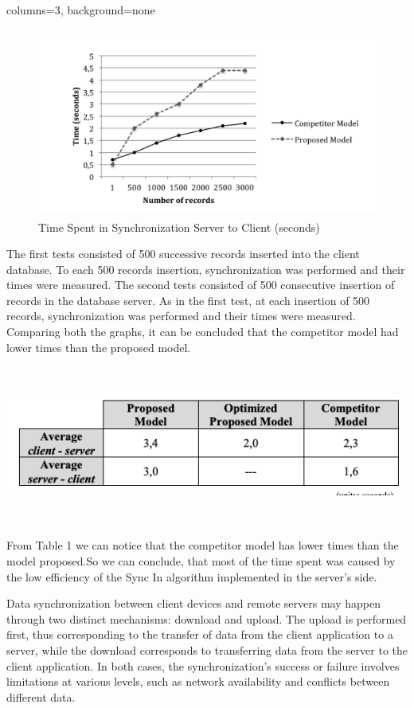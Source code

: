 \documentclass[portrait, paperwidth=91cm, paperheight=121cm, fontscale=0.35]{baposter}
\begin{document}
\begin{poster}{columns=3, background=none}
{     \begin{figure}[H]
     \centering
     \includegraphics[height=6.2cm, width=\textwidth]{graph2.png}
      \caption{Time Spent in Synchronization Server to Client (seconds)}\label{graph2}
     \end{figure}
     
The first tests consisted of 500 successive records inserted into the client database. To each 500 records insertion, synchronization was performed and their times were measured. The second tests consisted of 500 consecutive insertion of records in the database server. As in the first test, at each insertion of 500 records, synchronization was performed and their times were measured. Comparing both the graphs, it can be concluded that the competitor model had lower times than the proposed model.

      
      \centering
      \includegraphics[height=5.2cm, width=\textwidth]{table1.png}
      \caption{Table 1: Average Time Synchronization between the models}
      
From Table 1 we can notice that the competitor model has lower times than the model proposed.So we can conclude, that most of the time spent was caused by the low efficiency of the Sync In algorithm implemented in the server’s side. 
}

{Data synchronization between client devices and remote servers may happen through two distinct mechanisms: download and upload. The upload is performed first, thus corresponding to the transfer of data from the client application to a server, while the download corresponds to transferring data from the server to the client application. In both cases, the synchronization’s success or failure involves limitations at various levels, such as network availability and conflicts between different data. 

}
\end{poster}
\end{document}
